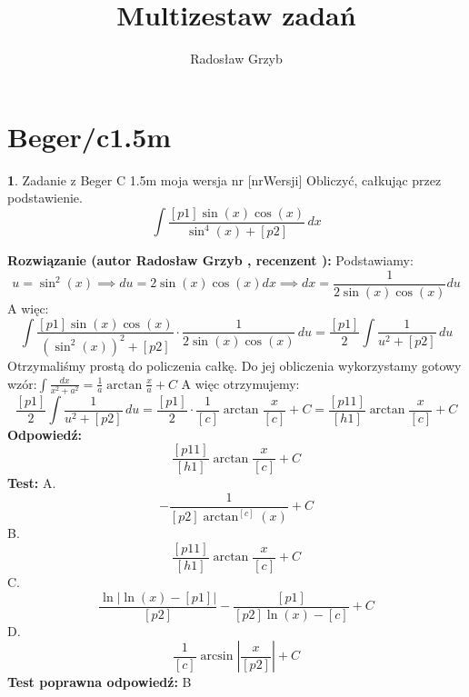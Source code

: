 \documentclass[12pt, a4paper]{article}
\title{Multizestaw zadań}
\author{Radosław Grzyb}
\date{}
\theoremstyle{definition} %
\newtheorem{zad}{}
\newcommand{\kategoria}[1]{\section{#1}} %
\newcommand{\zadStart}[1]{\begin{zad}#1\newline} %
\newcommand{\zadStop}{\end{zad}}   %
\newcommand{\rozwStart}[2]{\noindent \textbf{Rozwiązanie (autor #1 , recenzent #2): }\newline} %
\newcommand{\rozwStop}{\newline}                                            %
\newcommand{\odpStart}{\noindent \textbf{Odpowiedź:}\newline}    %
\newcommand{\odpStop}{\newline}                                             %
\newcommand{\testStart}{\noindent \textbf{Test:}\newline} %
\newcommand{\testStop}{\newline} %
\newcommand{\kluczStart}{\noindent \textbf{Test poprawna odpowiedź:}\newline} %
\newcommand{\kluczStop}{\newline} %
\begin{document}
\maketitle
\kategoria{Beger/c1.5m}
\zadStart{Zadanie z Beger C 1.5m moja wersja nr [nrWersji]}
Obliczyć, całkując przez podstawienie.
$$\int \frac{[p1]\sin(x)\cos(x)}{\sin^{4}(x)+[p2]} \,dx$$
\zadStop
\rozwStart{Radosław Grzyb}{}
Podstawiamy:
$$u=\sin^{2}(x) \implies du=2\sin(x)\cos(x)dx \implies dx=\frac{1}{2\sin(x)\cos(x)} du$$
A więc:
$$\int \frac{[p1]\sin(x)\cos(x)}{(\sin^{2}(x))^{2}+[p2]}\cdot\frac{1}{2\sin(x)\cos(x)} \,du=\frac{[p1]}{2}\int\frac{1}{u^{2}+[p2]}\,du$$
Otrzymaliśmy prostą do policzenia całkę. Do jej obliczenia wykorzystamy gotowy wzór:$\int\frac{dx}{x^2+a^2}=\frac{1}{a}\arctan\frac{x}{a}+C$
A więc otrzymujemy:
$$\frac{[p1]}{2}\int\frac{1}{u^{2}+[p2]}\,du=\frac{[p1]}{2}\cdot\frac{1}{[c]}\arctan\frac{x}{[c]}+C=\frac{[p11]}{[h1]}\arctan\frac{x}{[c]}+C$$
\rozwStop
\odpStart
$$\frac{[p11]}{[h1]}\arctan\frac{x}{[c]}+C$$
\odpStop
\testStart
A.$$-\frac{1}{[p2]\arctan^{[c]}(x)}+C$$
B.$$\frac{[p11]}{[h1]}\arctan\frac{x}{[c]}+C$$
C.$$\frac{\ln|\ln(x)-[p1]|}{[p2]}-\frac{[p1]}{[p2]\ln(x)-[c]}+C$$
D.$$\frac{1}{[c]}\arcsin|\frac{x}{[p2]}|+C$$
\testStop
\kluczStart
B
\kluczStop
\end{document}
